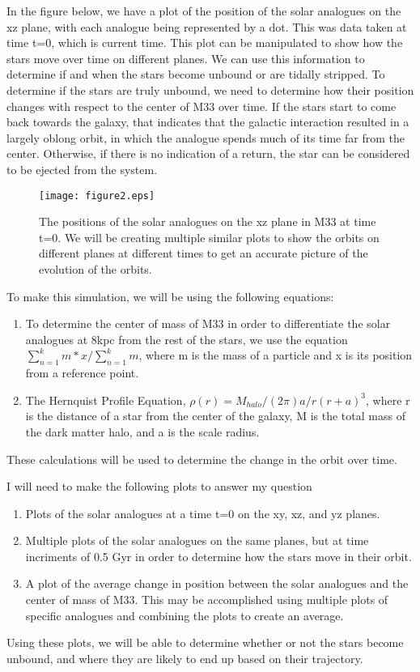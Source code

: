 \documentclass{aastex63}
\begin{document}
In the figure below, we have a plot of the position of the solar analogues on the xz plane, with each analogue being represented by a dot. This was data taken at time t=0, which is current time. This plot can be manipulated to show how the stars move over time on different planes. We can use this information to determine if and when the stars become unbound or are tidally stripped. To determine if the stars are truly unbound, we need to determine how their position changes with respect to the center of M33 over time. If the stars start to come back towards the galaxy, that indicates that the galactic interaction resulted in a largely oblong orbit, in which the analogue spends much of its time far from the center. Otherwise, if there is no indication of a return, the star can be considered to be ejected from the system.

\begin{figure}
    \texttt{[image: figure2.eps]}
    \caption{The positions of the solar analogues on the xz plane in M33 at time t=0. We will be creating multiple similar plots to show the orbits on different planes at different times to get an accurate picture of the evolution of the orbits.}
\end{figure}

To make this simulation, we will be using the following equations:
\begin{enumerate}
    \item To determine the center of mass of M33 in order to differentiate the solar analogues at 8kpc from the rest of the stars, we use the equation $\sum_{n=1}^{k}m*x / \sum_{n=1}^{k}m$, where m is the mass of a particle and x is its position from a reference point.
    \item The Hernquist Profile Equation, $\rho (r) = M_{halo}/(2\pi) a/r(r+a)^{3}$, where r is the distance of a star from the center of the galaxy, M is the total mass of the dark matter halo, and a is the scale radius.
\end{enumerate}
These calculations will be used to determine the change in the orbit over time.

I will need to make the following plots to answer my question
\begin{enumerate}
    \item Plots of the solar analogues at a time t=0 on the xy, xz, and yz planes.
    \item Multiple plots of the solar analogues on the same planes, but at time incriments of 0.5 Gyr in order to determine how the stars move in their orbit.
    \item A plot of the average change in position between the solar analogues and the center of mass of M33. This may be accomplished using multiple plots of specific analogues and combining the plots to create an average.
\end{enumerate}
Using these plots, we will be able to determine whether or not the stars become unbound, and where they are likely to end up based on their trajectory.
\end{document}

